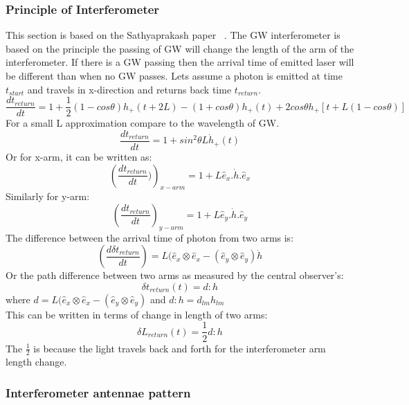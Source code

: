 \documentclass{ttuthes2007}
\begin{document}
\subsubsection{Principle of Interferometer}
This section is based on the Sathyaprakash paper ~\cite{Sathyaprakash_2009}. The
\ac{GW} interferometer is based on the principle the passing of \ac{GW} will
change the length of the arm of the interferometer. If there is a \ac{GW}
passing then the arrival time of emitted laser will be different than when no
\ac{GW} passes. Lets assume a photon is emitted at time $t_{start}$ and travels
in x-direction and returns back time $t_{return}$.
\begin{equation}
\frac{dt_{return}}{dt}=1+\frac{1}{2}{(1-cos\theta)h_+(t+2L)-(1+cos\theta)h_+(t)
+ 2cos\theta h_+[t+L(1-cos\theta)]}
\end{equation}
For a small L approximation compare to the wavelength of \ac{GW}.
\begin{equation}
\frac{dt_{return}}{dt} =1+sin^2\theta L \dot{h}_+ (t)
\end{equation}
Or for x-arm, it can be written as:
\begin{equation}
\left(\frac{dt_{return}}{dt})\right)_{x-arm}=1+L\hat{e}_x.\dot{h}.\hat{e}_x
\end{equation}
Similarly for y-arm:
\begin{equation}                                                                
\left(\frac{dt_{return}}{dt}\right)_{y-arm}=1+L\hat{e}_y.\dot{h}.\hat{e}_y  
\end{equation}  
The difference between the arrival time of photon from two arms is:
\begin{equation}
\left(\frac{d\delta t_{return}}{dt}\right)=L(\hat{e}_x\otimes\hat{e}_x-(\hat{e}_y\otimes\hat{e}_y)\dot{h}
\end{equation}
Or the path difference between two arms as measured by the central observer's:
\begin{equation}
\delta t_{return}(t)=d:h
\end{equation}
where $d=L(\hat{e}_x\otimes\hat{e}_x-(\hat{e}_y\otimes\hat{e}_y)$ and 
$d:h=d_{lm}h_{lm}$
\\
This can be written in terms of change in length of two arms:
\begin{equation}
\delta L_{return}(t)=\frac{1}{2}d:h 
\end{equation}
The $\frac{1}{2}$ is because the light travels back and forth for the
interferometer arm length change.
\subsubsection{Interferometer antennae pattern}
\end{document}
